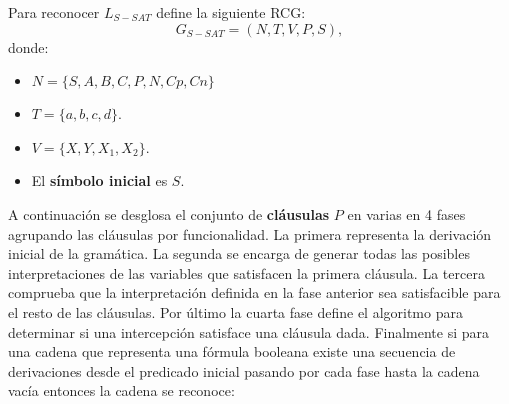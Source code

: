 Para reconocer $L_{S-SAT}$ define la siguiente RCG:
\[
    G_{S-SAT} = (N, T, V, P, S),
\]
donde:

\begin{itemize}
    \item $N=\{S,A,B,C,P,N,Cp,Cn\}$
    \item $T=\{a,b,c,d\}$.
    \item $V=\{X,Y,X_1,X_2\}$.
    \item El \textbf{símbolo inicial} es $S$.
\end{itemize}

A continuación se desglosa el conjunto de \textbf{cláusulas} $P$ en varias en 4 fases agrupando las cláusulas por funcionalidad.
La primera representa la derivación inicial de la gramática. La segunda se encarga de generar todas las posibles
interpretaciones de las variables que satisfacen la primera cláusula. La tercera comprueba que la interpretación
definida en la fase anterior sea satisfacible para el resto de las cláusulas. Por último la cuarta fase
define el algoritmo para determinar si una intercepción satisface una cláusula dada. Finalmente
si para una cadena que representa una fórmula booleana existe una secuencia de derivaciones desde el predicado
inicial pasando por cada fase hasta la cadena vacía entonces la cadena se reconoce:

